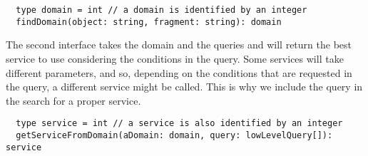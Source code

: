 \begin{verbatim}
  type domain = int // a domain is identified by an integer
  findDomain(object: string, fragment: string): domain
\end{verbatim}

The second interface takes the domain and the queries and will return the best service to use considering the conditions in the query. Some services will take different parameters, and so, depending on the conditions that are requested in the query, a different service might be called. This is why we include the query in the search for a proper service.

\begin{verbatim}
  type service = int // a service is also identified by an integer
  getServiceFromDomain(aDomain: domain, query: lowLevelQuery[]): service
\end{verbatim}




